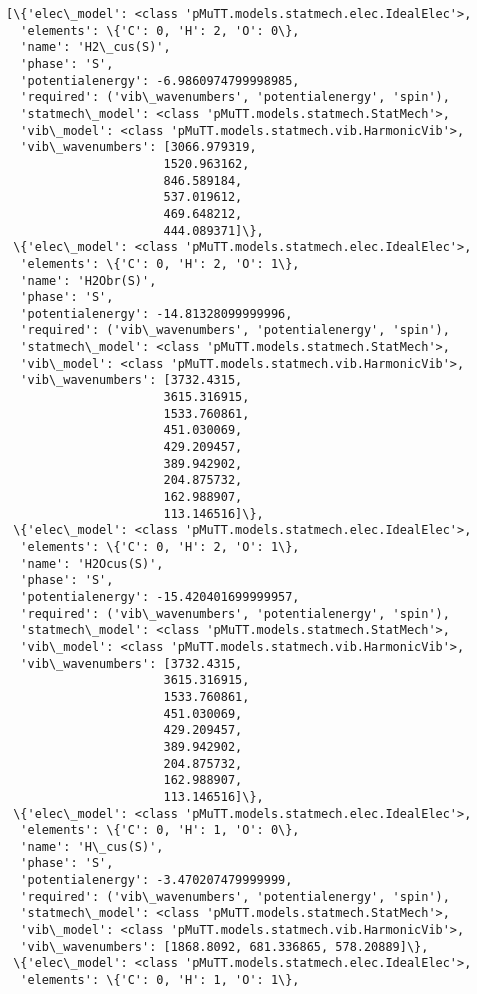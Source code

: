 \documentclass[11pt]{article}
\begin{document}
    \begin{Verbatim}[commandchars=\\\{\}]
[\{'elec\_model': <class 'pMuTT.models.statmech.elec.IdealElec'>,
  'elements': \{'C': 0, 'H': 2, 'O': 0\},
  'name': 'H2\_cus(S)',
  'phase': 'S',
  'potentialenergy': -6.9860974799998985,
  'required': ('vib\_wavenumbers', 'potentialenergy', 'spin'),
  'statmech\_model': <class 'pMuTT.models.statmech.StatMech'>,
  'vib\_model': <class 'pMuTT.models.statmech.vib.HarmonicVib'>,
  'vib\_wavenumbers': [3066.979319,
                      1520.963162,
                      846.589184,
                      537.019612,
                      469.648212,
                      444.089371]\},
 \{'elec\_model': <class 'pMuTT.models.statmech.elec.IdealElec'>,
  'elements': \{'C': 0, 'H': 2, 'O': 1\},
  'name': 'H2Obr(S)',
  'phase': 'S',
  'potentialenergy': -14.81328099999996,
  'required': ('vib\_wavenumbers', 'potentialenergy', 'spin'),
  'statmech\_model': <class 'pMuTT.models.statmech.StatMech'>,
  'vib\_model': <class 'pMuTT.models.statmech.vib.HarmonicVib'>,
  'vib\_wavenumbers': [3732.4315,
                      3615.316915,
                      1533.760861,
                      451.030069,
                      429.209457,
                      389.942902,
                      204.875732,
                      162.988907,
                      113.146516]\},
 \{'elec\_model': <class 'pMuTT.models.statmech.elec.IdealElec'>,
  'elements': \{'C': 0, 'H': 2, 'O': 1\},
  'name': 'H2Ocus(S)',
  'phase': 'S',
  'potentialenergy': -15.420401699999957,
  'required': ('vib\_wavenumbers', 'potentialenergy', 'spin'),
  'statmech\_model': <class 'pMuTT.models.statmech.StatMech'>,
  'vib\_model': <class 'pMuTT.models.statmech.vib.HarmonicVib'>,
  'vib\_wavenumbers': [3732.4315,
                      3615.316915,
                      1533.760861,
                      451.030069,
                      429.209457,
                      389.942902,
                      204.875732,
                      162.988907,
                      113.146516]\},
 \{'elec\_model': <class 'pMuTT.models.statmech.elec.IdealElec'>,
  'elements': \{'C': 0, 'H': 1, 'O': 0\},
  'name': 'H\_cus(S)',
  'phase': 'S',
  'potentialenergy': -3.470207479999999,
  'required': ('vib\_wavenumbers', 'potentialenergy', 'spin'),
  'statmech\_model': <class 'pMuTT.models.statmech.StatMech'>,
  'vib\_model': <class 'pMuTT.models.statmech.vib.HarmonicVib'>,
  'vib\_wavenumbers': [1868.8092, 681.336865, 578.20889]\},
 \{'elec\_model': <class 'pMuTT.models.statmech.elec.IdealElec'>,
  'elements': \{'C': 0, 'H': 1, 'O': 1\},

\end{Verbatim}
\end{document}
